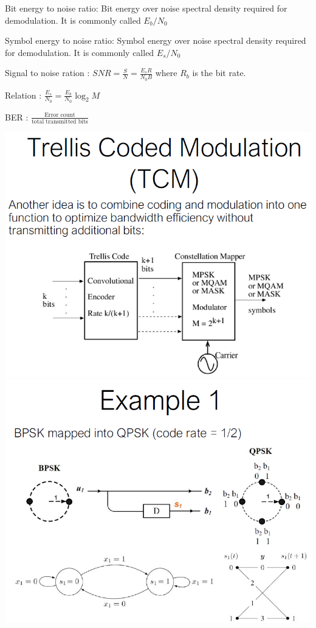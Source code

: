 \begin{multicols*}{4}
    Bit energy to noise ratio: Bit energy over noise
    spectral density required for demodulation. It is
    commonly called $E_b/N_0$

    Symbol energy to noise ratio: Symbol energy over
    noise spectral density required for demodulation. It is
    commonly called $E_s/N_0$

    Signal to noise ration : $SNR = \frac{S}{N}=\frac{E_sR}{N_0B}$ where $R_b$ is the bit rate.

    Relation : $\frac{E_s}{N_0}=\frac{E_b}{N_0}\log_2M$

    BER : $\frac{\text{Error count}}{\text{total transmitted bits}}$

    \includegraphics[width=\columnwidth]{images/merde1.png}
    \includegraphics[width=\columnwidth]{images/merde2.png}

\end{multicols*}
